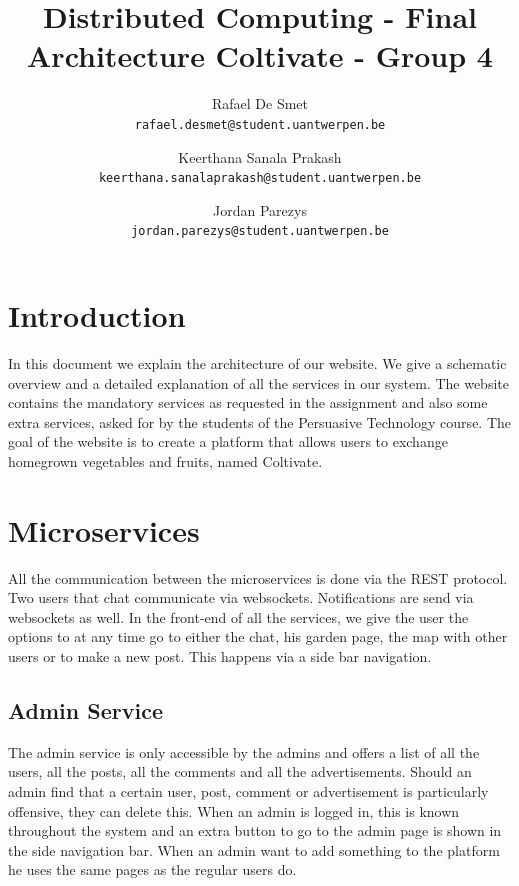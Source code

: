 \documentclass[a4paper,12pt]{article}
\begin{document}
\title{Distributed Computing - Final Architecture Coltivate - Group 4}
\author{ Rafael De Smet \\
  \texttt{rafael.desmet@student.uantwerpen.be}  \and
  Keerthana Sanala Prakash \\
  \texttt{keerthana.sanalaprakash@student.uantwerpen.be} \and
  Jordan Parezys \\
  \texttt{jordan.parezys@student.uantwerpen.be}}
\date{}
\maketitle

\section{Introduction}

In this document we explain the architecture of our website. We give a schematic overview and a detailed explanation of all the services in our system. The website contains the mandatory services as requested in the assignment and also some extra services, asked for by the students of the Persuasive Technology course. The goal of the website is to create a platform that allows users to exchange homegrown vegetables and fruits, named Coltivate.

\section{Microservices}

All the communication between the microservices is done via the REST protocol. Two users that chat communicate via websockets. Notifications are send via websockets as well. In the front-end of all the services, we give the user the options to at any time go to either the chat, his garden page, the map with other users or to make a new post. This happens via a side bar navigation.

\subsection{Admin Service}

The admin service is only accessible by the admins and offers a list of all the users, all the posts, all the comments and all the advertisements. Should an admin find that a certain user, post, comment or advertisement is particularly offensive, they can delete this. When an admin is logged in, this is known throughout the system and an extra button to go to the admin page is shown in the side navigation bar. When an admin want to add something to the platform he uses the same pages as the regular users do.
\end{document}

